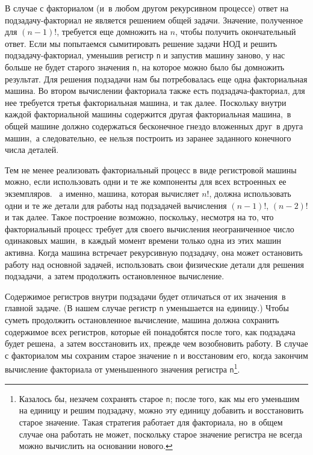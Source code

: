 В случае с факториалом (и~в любом другом рекурсивном
процессе) ответ на подзадачу-факториал не является решением общей
задачи.  Значение, полученное для $(n-1)!$, требуется еще
домножить на $n$, чтобы получить окончательный ответ. Если
мы попытаемся сымитировать решение задачи НОД и решить
подзадачу-факториал, уменьшив регистр {\tt n} и запустив машину
заново, у нас больше не будет старого значения {\tt n}, на
которое можно было бы домножить результат.  Для решения подзадачи нам
бы потребовалась еще одна факториальная машина.  Во втором вычислении
факториала также есть подзадача-факториал, для нее требуется третья
факториальная машина, и так далее.  Поскольку внутри каждой
факториальной машины содержится другая факториальная машина,~в общей
машине должно содержаться бесконечное гнездо вложенных друг~в друга
машин,~а следовательно, ее нельзя построить из заранее заданного
конечного числа деталей.

Тем не менее реализовать факториальный процесс в
виде регистровой машины можно, если использовать одни и те же
компоненты для всех встроенных ее экземпляров. ~а именно, машина,
которая вычисляет $n!$, должна использовать одни и те же
детали для работы над подзадачей вычисления $(n-1)!$,
$(n-2)!$ и так далее.  Такое построение возможно,
поскольку, несмотря на то, что факториальный процесс требует для
своего вычисления неограниченное число одинаковых машин,~в каждый
момент времени только одна из этих машин активна.  Когда машина
встречает рекурсивную подзадачу, она может остановить работу над
основной задачей, использовать свои физические детали для решения
подзадачи,~а затем продолжить остановленное вычисление.

Содержимое регистров внутри подзадачи будет отличаться от
их значения~в главной задаче. (В нашем случае регистр {\tt n}
уменьшается на единицу.)  Чтобы суметь продолжить остановленное
вычисление, машина должна сохранить содержимое всех регистров, которые
ей понадобятся после того, как подзадача будет решена,~а затем
восстановить их, прежде чем возобновить работу.  В случае с
факториалом мы сохраним старое значение {\tt n} и восстановим
его, когда закончим вычисление факториала от уменьшенного значения
регистра {\tt n}\footnote{Казалось бы, незачем сохранять старое
{\tt n}; после того, как мы его уменьшим на единицу и решим
подзадачу, можно эту единицу добавить и восстановить старое значение.
Такая стратегия работает для факториала, но~в общем случае она
работать не может, поскольку старое значение регистра не всегда можно
вычислить на основании нового.
}.

